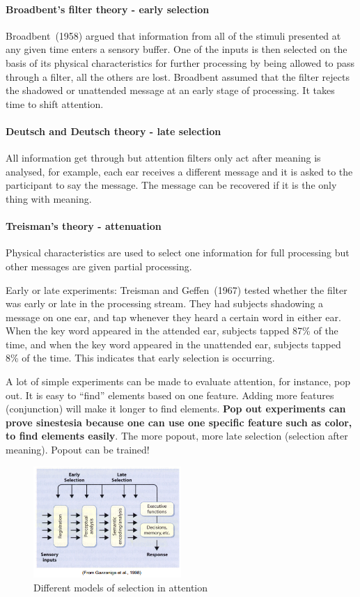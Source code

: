 \documentclass[12pt,article,oneside,a4paper]{memoir}
\begin{document}
\paragraph{Broadbent's filter theory - early selection}
Broadbent~(1958) argued that information from all of the stimuli presented at
any given time enters a sensory buffer. One of the inputs is then selected on
the basis of its physical characteristics for further processing by being
allowed to pass through a filter, all the others are lost. Broadbent assumed
that the filter rejects the shadowed or unattended message at an early stage of
processing. It takes time to shift attention.

\paragraph{Deutsch and Deutsch theory - late selection}
All information get through but attention filters only act after meaning is
analysed, for example, each ear receives a different message and it is asked to
the participant to say the message. The message can be recovered if it is the
only thing with meaning.

\paragraph{Treisman's theory - attenuation}
Physical characteristics are used to select one information for full processing
but other messages are given partial processing. 

Early or late experiments: Treisman and Geffen~(1967) tested whether the filter
was early or late in the processing stream. They had subjects shadowing a
message on one ear, and tap whenever they heard a certain word in either ear.
When the key word appeared in the attended ear, subjects tapped 87\% of the
time, and when the key word appeared in the unattended ear, subjects tapped 8\%
of the time. This indicates that early selection is occurring.

A lot of simple experiments can be made to evaluate attention, for instance,
pop out. It is easy to ``find'' elements based on one feature. Adding more
features (conjunction) will make it longer to find elements.
\textbf{Pop out experiments can prove sinestesia because one can use one
specific feature such as color, to find elements easily}. The more popout, more
late selection (selection after meaning). Popout can be trained!

\begin{figure}[h]
  \centering
  \includegraphics[width=0.5\textwidth]{imgs/early-late-selection.png}
  \caption{Different models of selection in attention}
  \label{fig:early-late-selection}
\end{figure}
\end{document}
